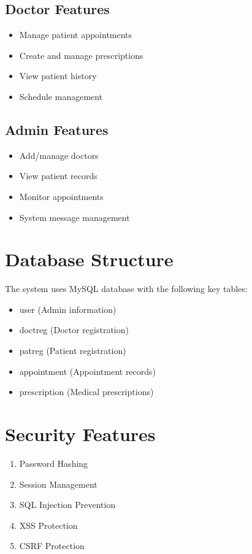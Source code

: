 \documentclass[11pt,a4paper]{article}
\begin{document}
\subsection{Doctor Features}
\begin{itemize}
    \item Manage patient appointments
    \item Create and manage prescriptions
    \item View patient history
    \item Schedule management
\end{itemize}

\subsection{Admin Features}
\begin{itemize}
    \item Add/manage doctors
    \item View patient records
    \item Monitor appointments
    \item System message management
\end{itemize}

\section{Database Structure}
The system uses MySQL database with the following key tables:
\begin{itemize}
    \item user (Admin information)
    \item doctreg (Doctor registration)
    \item patreg (Patient registration)
    \item appointment (Appointment records)
    \item prescription (Medical prescriptions)
\end{itemize}

\section{Security Features}
\begin{enumerate}
    \item Password Hashing
    \item Session Management
    \item SQL Injection Prevention
    \item XSS Protection
    \item CSRF Protection
\end{enumerate}
\end{document}
